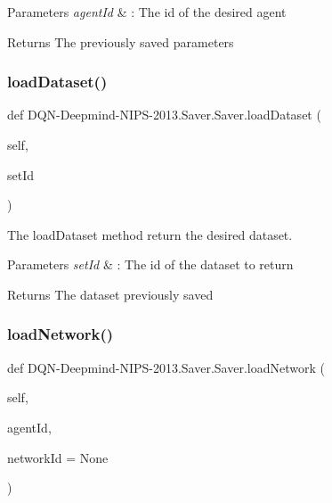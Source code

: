\begin{DoxyParams}{Parameters}
{\em agent\+Id} & \+: The id of the desired agent\\
\hline
\end{DoxyParams}
\begin{DoxyReturn}{Returns}
The previously saved parameters 
\end{DoxyReturn}
\hypertarget{classDQN-Deepmind-NIPS-2013_1_1Saver_1_1Saver_a76d60329698faf415c4ed0dae362f53e}{}\label{classDQN-Deepmind-NIPS-2013_1_1Saver_1_1Saver_a76d60329698faf415c4ed0dae362f53e} 
\subsubsection{\texorpdfstring{load\+Dataset()}{loadDataset()}}
{\footnotesize\ttfamily def D\+QN-\/Deepmind-\/N\+I\+PS-\/2013.Saver.\+Saver.\+load\+Dataset (\begin{DoxyParamCaption}\item[{}]{self,  }\item[{}]{set\+Id }\end{DoxyParamCaption})}



The load\+Dataset method return the desired dataset. 


\begin{DoxyParams}{Parameters}
{\em set\+Id} & \+: The id of the dataset to return\\
\hline
\end{DoxyParams}
\begin{DoxyReturn}{Returns}
The dataset previously saved 
\end{DoxyReturn}
\hypertarget{classDQN-Deepmind-NIPS-2013_1_1Saver_1_1Saver_a90f2e74db8a2b69b94959945ffb896f6}{}\label{classDQN-Deepmind-NIPS-2013_1_1Saver_1_1Saver_a90f2e74db8a2b69b94959945ffb896f6} 
\subsubsection{\texorpdfstring{load\+Network()}{loadNetwork()}}
{\footnotesize\ttfamily def D\+QN-\/Deepmind-\/N\+I\+PS-\/2013.Saver.\+Saver.\+load\+Network (\begin{DoxyParamCaption}\item[{}]{self,  }\item[{}]{agent\+Id,  }\item[{}]{network\+Id = {\ttfamily None} }\end{DoxyParamCaption})}



